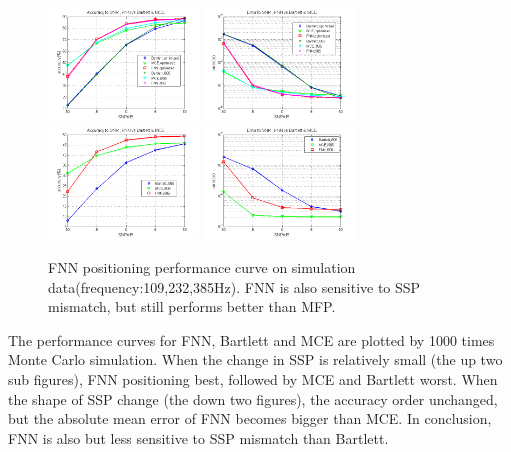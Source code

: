 \begin{figure}
\includegraphics[width=4cm,height=3cm]{figure/Accuracy_to_SNR_FNN_vs_Bartlett_MCE}
\includegraphics[width=4cm,height=3cm]{figure/Error_to_SNR_FNN_vs_Bartlett_MCE}
\includegraphics[width=4cm,height=3cm]{figure/Accuracy_to_SNR_FNN_vs_Bartlett_MCE_i906}
\includegraphics[width=4cm,height=3cm]{figure/Error_to_SNR_FNN_vs_Bartlett_MCE_i906}
\caption{FNN positioning performance curve on simulation data(frequency:109,232,385Hz).
 FNN is also sensitive to SSP mismatch, but still performs better than MFP.
}
\end{figure}
The performance curves for FNN, Bartlett and MCE are plotted by 1000 times Monte Carlo simulation. When the change in SSP is relatively small (the up two sub figures), FNN positioning best, followed by MCE and Bartlett worst.
When the shape of SSP change (the down two figures), the accuracy order unchanged, but the absolute mean error of FNN becomes bigger than MCE. In conclusion, FNN is also but less sensitive to SSP mismatch than Bartlett.

